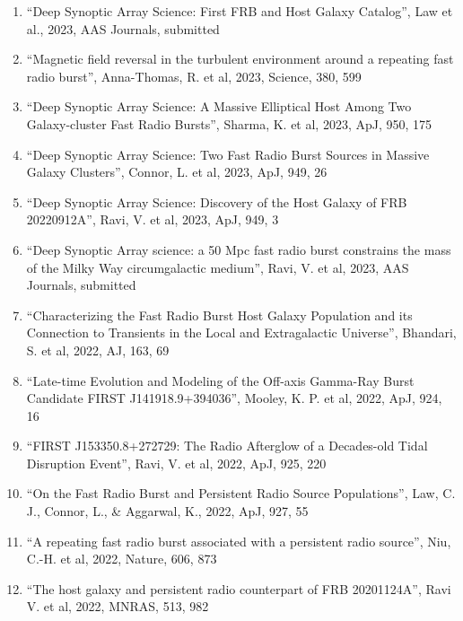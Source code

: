\documentclass[11pt]{article}
\begin{document}
\begin{enumerate}

    \item ``Deep Synoptic Array Science: First FRB and Host Galaxy Catalog'', Law et al., 2023, AAS Journals, submitted

    \item ``Magnetic field reversal in the turbulent environment around a repeating fast radio burst'', Anna-Thomas, R. et al, 2023, Science, 380, 599

    \item ``Deep Synoptic Array Science: A Massive Elliptical Host Among Two Galaxy-cluster Fast Radio Bursts'', Sharma, K. et al, 2023, ApJ, 950, 175

    \item ``Deep Synoptic Array Science: Two Fast Radio Burst Sources in Massive Galaxy Clusters'', Connor, L. et al, 2023, ApJ, 949, 26

    \item ``Deep Synoptic Array Science: Discovery of the Host Galaxy of FRB 20220912A'', Ravi, V. et al, 2023, ApJ, 949, 3

    \item ``Deep Synoptic Array science: a 50 Mpc fast radio burst constrains the mass of the Milky Way circumgalactic medium'', Ravi, V. et al, 2023, AAS Journals, submitted

    \item ``Characterizing the Fast Radio Burst Host Galaxy Population and its Connection to Transients in the Local and Extragalactic Universe'', Bhandari, S. et al, 2022, AJ, 163, 69

    \item ``Late-time Evolution and Modeling of the Off-axis Gamma-Ray Burst Candidate FIRST J141918.9+394036'', Mooley, K. P. et al, 2022, ApJ, 924, 16

    \item ``FIRST J153350.8+272729: The Radio Afterglow of a Decades-old Tidal Disruption Event'', Ravi, V. et al, 2022, ApJ, 925, 220

    \item ``On the Fast Radio Burst and Persistent Radio Source Populations'', Law, C. J., Connor, L., \& Aggarwal, K., 2022, ApJ, 927, 55

    \item ``A repeating fast radio burst associated with a persistent radio source'', Niu, C.-H. et al, 2022, Nature, 606, 873

    \item ``The host galaxy and persistent radio counterpart of FRB 20201124A'', Ravi V. et al, 2022, MNRAS, 513, 982


\end{enumerate}
\end{document}
